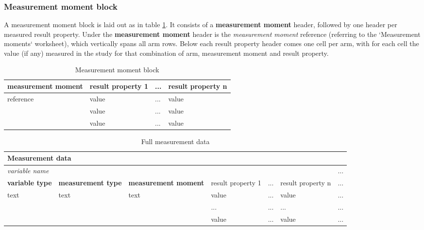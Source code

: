 \documentclass[a4paper,10pt]{article}
\begin{document}
\subsubsection{Measurement moment block}
A measurement moment block is laid out as in table \ref{table:Measurement moment block}. It consists of a \textbf{measurement moment} header, followed by one header per measured result property. Under the \textbf{measurement moment} header is the \textit{measurement moment} reference (referring to the `Measurement moments` worksheet), which vertically spans all arm rows. Below each result property header comes one cell per arm, with for each cell the value (if any) measured in the study for that combination of arm, measurement moment and result property.

\begin{table}[h]
  \centering
  \caption{Measurement moment block}
  \small
  \label{table:Measurement moment block}
  \begin{tabular}{|l|l|l|l|}
    \hline
    \textbf{measurement moment} & result property 1 &  ... & result property n \\ \hline
    \multirow{3}{*}{reference} & value & ... & value    \\  \cline{2-4}
                               & value & ... & value    \\  \cline{2-4}
                               & value & ... & value    \\  \cline{2-4}
    \hline
  \end{tabular}
\end{table}

\begin{table}[h]
  \centering
  \caption{Full measurement data}
  \small
  \label{table:Full measurement data}
  \begin{tabular}{|l|l|l|l|l|l|l|}
    \hline
    \multicolumn{7}{|l|}{\textbf{Measurement data}}  \\ \hline
    \multicolumn{6}{|l|}{\textit{variable name}}  & ...  \\ \hline
    \textbf{variable type} &\textbf{ measurement type} & \textbf{measurement moment} & result property 1 &  ... & result property n & ...\\ \hline
    text & text & text & value & ... & value       & ... \\  \cline{4-6} 
         &      &      & ...   & ... & ...        & ...  \\  \cline{4-6} 
         &      &      & value & ... & value      & ...  \\ \hline
  \end{tabular}
\end{table}
\end{document}
